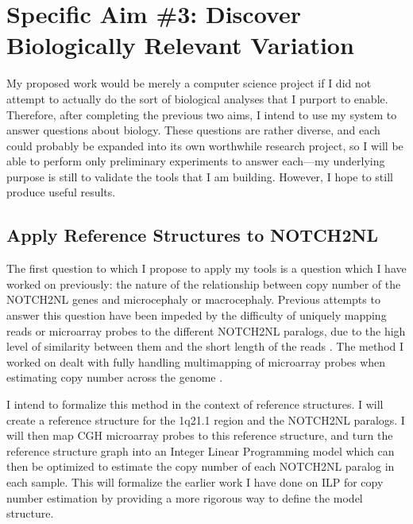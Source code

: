 \documentclass[11pt,proposal]{ucthesis}
\begin{document}
    


\section{Specific Aim \#3: Discover Biologically Relevant Variation}

My proposed work would be merely a computer science project if I did not attempt to actually do the sort of biological analyses that I purport to enable. Therefore, after completing the previous two aims, I intend to use my system to answer questions about biology. These questions are rather diverse, and each could probably be expanded into its own worthwhile research project, so I will be able to perform only preliminary experiments to answer each---my underlying purpose is still to validate the tools that I am building. However, I hope to still produce useful results.

\subsection{Apply Reference Structures to NOTCH2NL}
\label{subsec:aim3notch}

The first question to which I propose to apply my tools is a question which I have worked on previously: the nature of the relationship between copy number of the NOTCH2NL genes and microcephaly or macrocephaly. Previous attempts to answer this question have been impeded by the difficulty of uniquely mapping reads or microarray probes to the different NOTCH2NL paralogs, due to the high level of similarity between them and the short length of the reads \cite{jacobs2014recently}. The method I worked on dealt with fully handling multimapping of microarray probes when estimating copy number across the genome \cite{jacobs2014recently}.

I intend to formalize this method in the context of reference structures. I will create a reference structure for the 1q21.1 region and the NOTCH2NL paralogs. I will then map CGH microarray probes to this reference structure, and turn the reference structure graph into an Integer Linear Programming model which can then be optimized to estimate the copy number of each NOTCH2NL paralog in each sample. This will formalize the earlier work I have done on ILP for copy number estimation by providing a more rigorous way to define the model structure.
\end{document}
